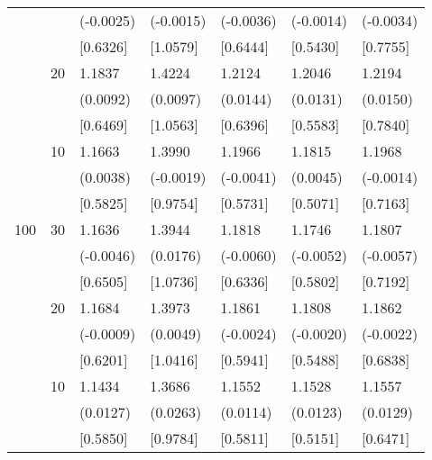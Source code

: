 \begin{table}[H]
{\begin{tabular}{c c | C{2.4cm} | C{2.4cm} | C{2.4cm} | C{2.4cm} | C{2.4cm} }
			&&(-0.0025)&(-0.0015)&(-0.0036)&(-0.0014)&(-0.0034)\\
			&&[0.6326]&[1.0579]&[0.6444]&[0.5430]&[0.7755]\\
			&20&1.1837&1.4224&1.2124&1.2046&1.2194\\
			&&(0.0092)&(0.0097)&(0.0144)&(0.0131)&(0.0150)\\
			&&[0.6469]&[1.0563]&[0.6396]&[0.5583]&[0.7840]\\
			&10&1.1663&1.3990&1.1966&1.1815&1.1968\\
			&&(0.0038)&(-0.0019)&(-0.0041)&(0.0045)&(-0.0014)\\
			&&[0.5825]&[0.9754]&[0.5731]&[0.5071]&[0.7163]\\
			\cmidrule(lr){1-7}
			100&30&1.1636&1.3944&1.1818&1.1746&1.1807\\
			&&(-0.0046)&(0.0176)&(-0.0060)&(-0.0052)&(-0.0057)\\
			&&[0.6505]&[1.0736]&[0.6336]&[0.5802]&[0.7192]\\
			&20&1.1684&1.3973&1.1861&1.1808&1.1862\\
			&&(-0.0009)&(0.0049)&(-0.0024)&(-0.0020)&(-0.0022)\\
			&&[0.6201]&[1.0416]&[0.5941]&[0.5488]&[0.6838]\\
			&10&1.1434&1.3686&1.1552&1.1528&1.1557\\
			&&(0.0127)&(0.0263)&(0.0114)&(0.0123)&(0.0129)\\
			&&[0.5850]&[0.9784]&[0.5811]&[0.5151]&[0.6471]\\
			\bottomrule[1.5pt]
	\end{tabular}}
	\label{table:table S.1}
\end{table}

